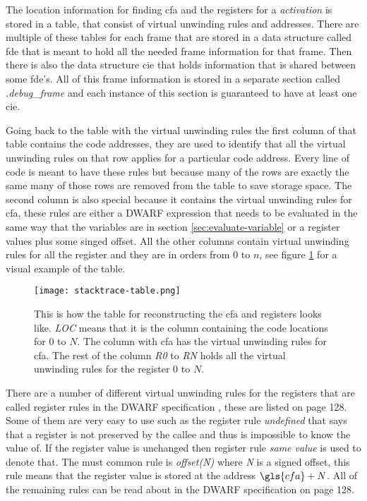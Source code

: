 The location information for finding \gls{cfa} and the registers for a \emph{activation} is stored in a table, that consist of virtual unwinding rules and addresses.
There are multiple of these tables for each frame that are stored in a data structure called \gls{fde} that is meant to hold all the needed frame information for that frame.
Then there is also the data structure \gls{cie} that holds information that is shared between some \acrlong{fde}'s.
All of this frame information is stored in a separate section called \emph{.debug\_frame} and each instance of this section is guaranteed to have at least one \acrlong{cie}.


Going back to the table with the virtual unwinding rules the first column of that table contains the code addresses, they are used to identify that all the virtual unwinding rules on that row applies for a particular code address.
Every line of code is meant to have these rules but because many of the rows are exactly the same many of those rows are removed from the table to save storage space.
The second column is also special because it contains the virtual unwinding rules for \gls{cfa}, these rules are either a \gls{DWARF} expression that needs to be evaluated in the same way that the variables are in section \ref{sec:evaluate-variable} or a register values plus some singed offset.
All the other columns contain virtual unwinding rules for all the register and they are in orders from $0$ to $n$, see figure \ref{fig:stacktracetable} for a visual example of the table.


\begin{figure}[h]
	\centering
	\texttt{[image: stacktrace-table.png]}
	\caption{This is how the table for reconstructing the \gls{cfa} and registers looks like. \emph{LOC} means that it is the column containing the code locations for $0$ to $N$. The column with \gls{cfa} has the virtual unwinding rules for \gls{cfa}. The rest of the column \emph{R0} to \emph{RN} holds all the virtual unwinding rules for the register $0$ to $N$.}
	\label{fig:stacktracetable}
\end{figure}


There are a number of different virtual unwinding rules for the registers that are called register rules in the \gls{DWARF} specification \cite{dwarf}, these are listed on page 128.
Some of them are very easy to use such as the register rule \emph{undefined} that says that a register is not preserved by the callee and thus is impossible to know the value of.
If the register value is unchanged then register rule \emph{same value} is used to denote that.
The must common rule is \emph{offset(N)} where \emph{N} is a signed offset, this rule means that the register value is stored at the address $\gls{cfa}+N$.
All of the remaining rules can be read about in the \gls{DWARF} specification \cite{dwarf} on page 128.


